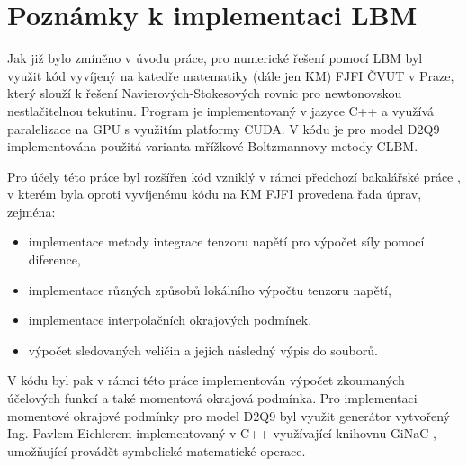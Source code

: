 \section{Poznámky k implementaci LBM}\label{poznamky k implementaci LBM}
Jak již bylo zmíněno v úvodu práce, pro numerické řešení pomocí LBM byl využit kód vyvíjený na katedře matematiky (dále jen KM) FJFI ČVUT v Praze, který slouží k řešení Navierových-Stokesových rovnic pro newtonovskou nestlačitelnou tekutinu. Program je implementovaný v jazyce C++ a využívá paralelizace na GPU s využitím platformy CUDA. V kódu je pro model D2Q9 implementována použitá varianta mřížkové Boltzmannovy metody CLBM.

Pro účely této práce byl rozšířen kód vzniklý v rámci předchozí bakalářské práce \cite{JB}, v kterém byla oproti vyvíjenému kódu na KM FJFI  provedena řada úprav, zejména:
\begin{itemize}
	\item implementace metody integrace tenzoru napětí pro výpočet síly pomocí diference,
	\item implementace různých způsobů lokálního výpočtu tenzoru napětí,
	\item implementace interpolačních okrajových podmínek,
	\item výpočet sledovaných veličin a jejich následný výpis do souborů.
\end{itemize}
V kódu byl pak v rámci této práce implementován výpočet zkoumaných účelových funkcí a také momentová okrajová podmínka. Pro implementaci momentové okrajové podmínky pro model D2Q9 byl využit generátor vytvořený Ing. Pavlem Eichlerem implementovaný v C++ využívající knihovnu GiNaC \cite{Ginac}, umožňující provádět symbolické matematické operace.
